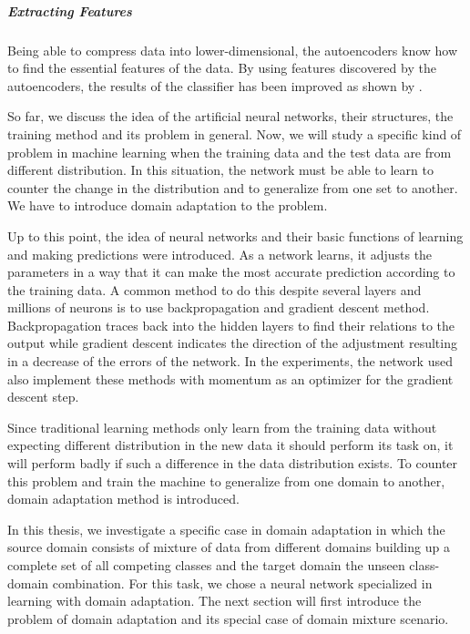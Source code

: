 \subparagraph*{Extracting Features}
Being able to compress data into lower-dimensional, the autoencoders know how to find the essential features of the data. By using features discovered by the autoencoders, the results of the classifier has been improved as shown by \cite{autoencoderDenoise}.


So far, we discuss the idea of the artificial neural networks, their structures, the training method and its problem in general. Now, we will study a specific kind of problem in machine learning when the training data and the test data are from different distribution. In this situation, the network must be able to learn to counter the change in the distribution and to generalize from one set to another. We have to introduce domain adaptation to the problem. 

Up to this point, the idea of neural networks and their basic functions of learning and making predictions were introduced. As a network learns, it adjusts the parameters in a way that it can make the most accurate prediction according to the training data. A common method to do this despite several layers and millions of neurons is to use backpropagation and gradient descent method. Backpropagation traces back into the hidden layers to find their relations to the output while gradient descent indicates the direction of the adjustment resulting in a decrease of the errors of the network. In the experiments, the network used also implement these methods with momentum as an optimizer for the gradient descent step. 

Since traditional learning methods only learn from the training data without expecting different distribution in the new data it should perform its task on,  it will perform badly if such a difference in the data distribution exists. To counter this problem and train the machine to generalize from one domain to another, domain adaptation method is introduced. 

In this thesis, we investigate a specific case in domain adaptation in which the source domain consists of mixture of data from different domains building up a complete set of all competing classes and the target domain the unseen class-domain combination. For this task, we chose a neural network specialized in learning with domain adaptation. The next section will first introduce the problem of domain adaptation and its special case of domain mixture scenario.